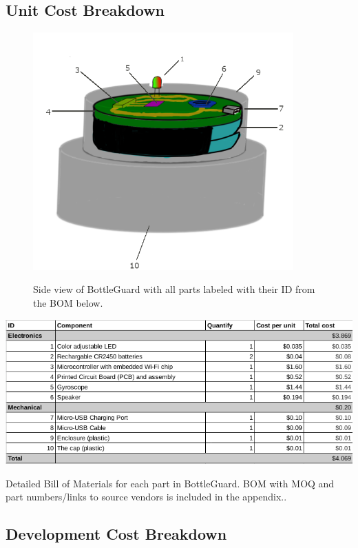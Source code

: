 \documentclass[12pt]{article}
\begin{document}
	
	\subsection*{Unit Cost Breakdown}
		\begin{figure}[H]
		\centering
		\includegraphics[width=10cm ]{DesignLabeled.png}
		\label{fig:design}
		\caption{Side view of BottleGuard with all parts labeled with their ID from the BOM below.}
	\end{figure}
\begin{table}[H]
	\includegraphics[width=\textwidth]{bom_small.png}
	\label{fig:bom}
	\caption{Detailed Bill of Materials for each part in BottleGuard. BOM with MOQ and part numbers/links to source vendors is included in the appendix..}
\end{table}
	\subsection*{Development Cost Breakdown}
\end{document}
